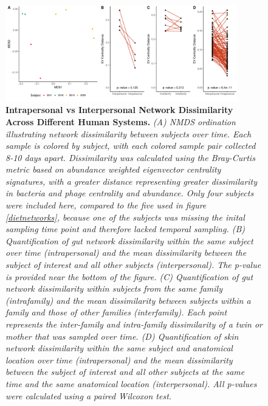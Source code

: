 \documentclass[12pt,]{article}
\begin{document}
\begin{figure}[htbp]
\centering
\includegraphics[width=0.90000\textwidth]{../figures/intrapersonal_diversity.pdf}
\caption{\textbf{Intrapersonal vs Interpersonal Network Dissimilarity
Across Different Human Systems.} \emph{(A) NMDS ordination illustrating
network dissimilarity between subjects over time. Each sample is colored
by subject, with each colored sample pair collected 8-10 days apart.
Dissimilarity was calculated using the Bray-Curtis metric based on
abundance weighted eigenvector centrality signatures, with a greater
distance representing greater dissimilarity in bacteria and phage
centrality and abundance. Only four subjects were included here,
compared to the five used in figure \ref{dietnetworks}, because one of
the subjects was missing the inital sampling time point and therefore
lacked temporal sampling. (B) Quantification of gut network
dissimilarity within the same subject over time (intrapersonal) and the
mean dissimilarity between the subject of interest and all other
subjects (interpersonal). The p-value is provided near the bottom of the
figure. (C) Quantification of gut network dissimilarity within subjects
from the same family (intrafamily) and the mean dissimilarity between
subjects within a family and those of other families (interfamily). Each
point represents the inter-family and intra-family dissimilarity of a
twin or mother that was sampled over time. (D) Quantification of skin
network dissimilarity within the same subject and anatomical location
over time (intrapersonal) and the mean dissimilarity between the subject
of interest and all other subjects at the same time and the same
anatomical location (interpersonal). All p-values were calculated using
a paired Wilcoxon test.}\label{intradiv}}
\end{figure}
\end{document}
